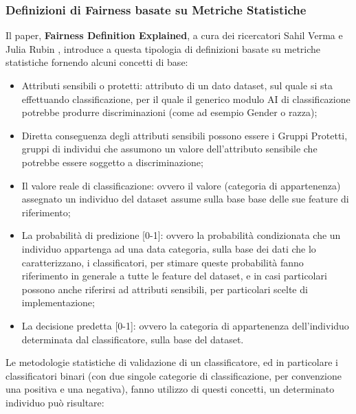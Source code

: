  \subsubsection{Definizioni di Fairness basate su Metriche Statistiche}
 
 Il paper, \textbf{Fairness Definition Explained}, a cura dei ricercatori Sahil Verma e Julia Rubin \cite{FairnessDefinitionExplained}, introduce a questa tipologia di definizioni basate su metriche statistiche fornendo alcuni concetti di base: 
 
 \begin{itemize}
     \item Attributi sensibili o protetti: attributo di un dato dataset, sul quale si sta effettuando classificazione, per il quale il generico modulo AI di classificazione potrebbe produrre discriminazioni (come ad esempio Gender o razza);
     \item Diretta conseguenza degli attributi sensibili possono essere i Gruppi Protetti, gruppi di individui che assumono un valore dell'attributo sensibile che potrebbe essere soggetto a discriminazione;
     \item Il valore reale di classificazione: ovvero il valore (categoria di appartenenza) assegnato un individuo del dataset assume sulla base base delle sue feature di riferimento;
     \item La probabilità di predizione [0-1]: ovvero la probabilità condizionata che un individuo appartenga ad una data categoria, sulla base dei dati che lo caratterizzano, i classificatori, per stimare queste probabilità fanno riferimento in generale a tutte le feature del dataset, e in casi particolari possono anche riferirsi ad attributi sensibili, per particolari scelte di implementazione;
     \item La decisione predetta [0-1]: ovvero la categoria di appartenenza dell'individuo determinata dal classificatore, sulla base del dataset.
 \end{itemize}
 
 Le metodologie statistiche di validazione di un classificatore, ed in particolare i classificatori binari (con due singole categorie di classificazione, per convenzione una positiva e una negativa), fanno utilizzo di questi concetti, un determinato individuo può risultare:
 
